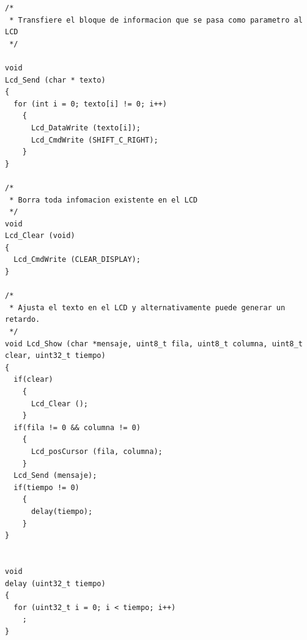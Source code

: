 \documentclass[paper=letter, fontsize=12pt]{article}
\begin{document}
\begin{lstlisting}[style=CStyle]
/*
 * Transfiere el bloque de informacion que se pasa como parametro al LCD
 */

void
Lcd_Send (char * texto)
{
  for (int i = 0; texto[i] != 0; i++)
    {
      Lcd_DataWrite (texto[i]);
      Lcd_CmdWrite (SHIFT_C_RIGHT);
    }
}

/*
 * Borra toda infomacion existente en el LCD
 */
void
Lcd_Clear (void)
{
  Lcd_CmdWrite (CLEAR_DISPLAY);
}

/*
 * Ajusta el texto en el LCD y alternativamente puede generar un retardo.
 */
void Lcd_Show (char *mensaje, uint8_t fila, uint8_t columna, uint8_t clear, uint32_t tiempo)
{
  if(clear)
    {
      Lcd_Clear ();
    }
  if(fila != 0 && columna != 0)
    {
      Lcd_posCursor (fila, columna);
    }
  Lcd_Send (mensaje);
  if(tiempo != 0)
    {
      delay(tiempo);
    }
}


void
delay (uint32_t tiempo)
{
  for (uint32_t i = 0; i < tiempo; i++)
    ;
}
\end{lstlisting}









\end{document}
